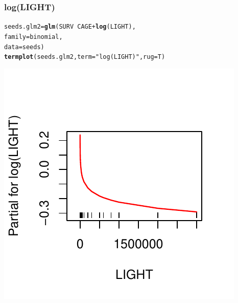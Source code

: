 \documentclass[handout]{beamer}\usepackage[]{graphicx}\usepackage[]{color}
\makeatletter
\def\maxwidth{ %
  \ifdim\Gin@nat@width>\linewidth
    \linewidth
  \else
    \Gin@nat@width
  \fi
}
\newcommand{\hlstr}[1]{\textcolor[rgb]{0.192,0.494,0.8}{#1}}%
\newcommand{\hlopt}[1]{\textcolor[rgb]{0,0,0}{#1}}%
\newcommand{\hlstd}[1]{\textcolor[rgb]{0.345,0.345,0.345}{#1}}%
\newcommand{\hlkwb}[1]{\textcolor[rgb]{0.69,0.353,0.396}{#1}}%
\newcommand{\hlkwc}[1]{\textcolor[rgb]{0.333,0.667,0.333}{#1}}%
\newcommand{\hlkwd}[1]{\textcolor[rgb]{0.737,0.353,0.396}{\textbf{#1}}}%
\newenvironment{kframe}{%
 \def\at@end@of@kframe{}%
 \ifinner\ifhmode%
  \def\at@end@of@kframe{\end{minipage}}%
  \begin{minipage}{\columnwidth}%
 \fi\fi%
 \def\FrameCommand##1{\hskip\@totalleftmargin \hskip-\fboxsep
 \colorbox{shadecolor}{##1}\hskip-\fboxsep
     \hskip-\linewidth \hskip-\@totalleftmargin \hskip\columnwidth}%
 \MakeFramed {\advance\hsize-\width
   \@totalleftmargin\z@ \linewidth\hsize
   \@setminipage}}%
 {\par\unskip\endMakeFramed%
 \at@end@of@kframe}
\newenvironment{knitrout}{}{} %
\makeatother
\begin{document}
\begin{frame}[fragile]\frametitle{log(LIGHT)}
\begin{knitrout}
\color{fgcolor}\begin{kframe}
\begin{alltt}
\hlstd{seeds.glm2} \hlkwb{=} \hlkwd{glm}\hlstd{(SURV} \hlopt{~}  \hlstd{CAGE} \hlopt{+} \hlkwd{log}\hlstd{(LIGHT),}
                 \hlkwc{family} \hlstd{= binomial,}
                 \hlkwc{data}\hlstd{=seeds)}
\hlkwd{termplot}\hlstd{(seeds.glm2,} \hlkwc{term}\hlstd{=}\hlstr{"log(LIGHT)"}\hlstd{,} \hlkwc{rug}\hlstd{=T)}
\end{alltt}
\end{kframe}
\includegraphics[width=\maxwidth]{figure/seeds_glm2-1} 

\end{knitrout}

\end{frame}
\end{document}
